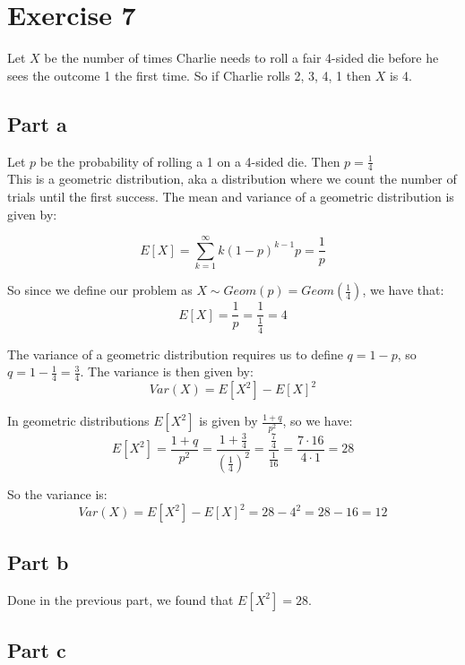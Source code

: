 \section{Exercise 7}
Let $X$ be the number of times Charlie needs to roll a fair 4-sided die before he sees the outcome 1 the first time. So if Charlie rolls 2, 3, 4, 1 then $X$ is 4.

\subsection{Part a}

Let $p$ be the probability of rolling a 1 on a 4-sided die. Then $p = \frac{1}{4}$\\

This is a geometric distribution, aka a distribution where we count the number of trials until the first success. The mean and variance of a geometric distribution is given by:

\[
	E[X] = \sum_{k=1}^{\infty}k(1-p)^{k-1}p = \frac{1}{p}
\]

So since we define our problem as $X \sim Geom(p) = Geom\left(\frac{1}{4}\right)$, we have that:
\[
	E[X] = \frac{1}{p} = \frac{1}{\frac{1}{4}} = 4
\]

The variance of a geometric distribution requires us to define $q = 1-p$, so $q = 1-\frac{1}{4} = \frac{3}{4}$. The variance is then given by:
\[
	Var(X) = E[X^2] - E[X]^2
\]

In geometric distributions $E[X^2]$ is given by $\frac{1+q}{p^2}$, so we have:
\[
	E[X^2] = \frac{1+q}{p^2} = \frac{1+\frac{3}{4}}{\left(\frac{1}{4}\right)^2} = \frac{\frac{7}{4}}{\frac{1}{16}} = \frac{7\cdot 16}{4\cdot 1} = 28
\]

So the variance is:
\[
	Var(X) = E[X^2] - E[X]^2 = 28 - 4^2 = 28 - 16 = 12
\]

\subsection{Part b}

Done in the previous part, we found that $E[X^2] = 28$.

\subsection{Part c}

